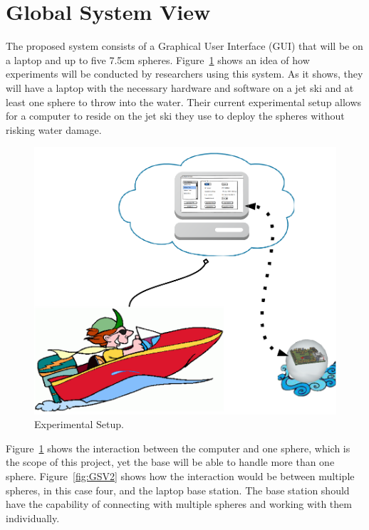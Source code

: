 \section{Global System View}

The proposed system consists of a Graphical User Interface (GUI) that will be on a laptop and up to five 7.5cm spheres.  Figure~\ref{fig:GSV1} shows an idea of how experiments will be conducted by researchers using this system.  As it shows, they will have a laptop with the necessary hardware and software on a jet ski and at least one sphere to throw into the water.  Their current experimental setup allows for a computer to reside on the jet ski they use to deploy the spheres without risking water damage.

\begin{figure}[H]
	\centering
	\includegraphics[scale=0.5]{img/GSV1}
	\caption{Experimental Setup. \label{fig:GSV1}}
\end{figure}

Figure~\ref{fig:GSV1} shows the interaction between the computer and one sphere, which is the scope of this project, yet the base will be able to handle more than one sphere.  Figure~\ref{fig:GSV2} shows how the interaction would be between multiple spheres, in this case four, and the laptop base station.  The base station should have the capability of connecting with multiple spheres and working with them individually.

